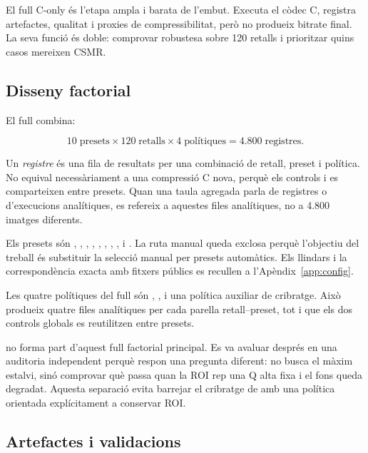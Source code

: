 El full C-only és l'etapa ampla i barata de l'embut. Executa el còdec C,
registra artefactes, qualitat i proxies de compressibilitat, però no produeix
bitrate final. La seva funció és doble: comprovar robustesa sobre 120 retalls i
prioritzar quins casos mereixen CSMR.

\subsection{Disseny factorial}

El full combina:

\begin{equation}
10\;\text{presets}\times120\;\text{retalls}
\times4\;\text{polítiques}=4.800\;\text{registres}.
\end{equation}

Un \emph{registre} és una fila de resultats per una combinació de retall, preset
i política. No equival necessàriament a una compressió C nova, perquè els
controls  i  es comparteixen entre presets. Quan
una taula agregada parla de registres o d'execucions analítiques, es refereix a
aquestes files analítiques, no a 4.800 imatges diferents.

Els presets són , ,
, , ,
, , ,
 i . La ruta manual queda exclosa perquè
l'objectiu del treball és substituir la selecció manual per presets automàtics.
Els llindars i la correspondència exacta amb fitxers públics es recullen a
l'Apèndix~\ref{app:config}.

Les quatre polítiques del full són , ,
 i una política auxiliar de cribratge. Això produeix quatre
files analítiques per cada parella retall--preset, tot i que els dos controls
globals es reutilitzen entre presets.

 no forma part d'aquest full factorial principal. Es va
avaluar després en una auditoria independent perquè respon una pregunta
diferent: no busca el màxim estalvi, sinó comprovar què passa quan la ROI rep una
Q alta fixa i el fons queda degradat. Aquesta separació evita barrejar el
cribratge de  amb una política orientada explícitament a
conservar ROI.

\subsection{Artefactes i validacions}

